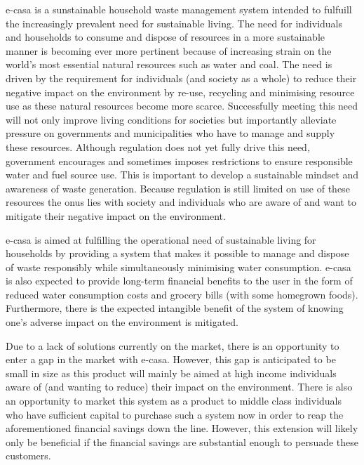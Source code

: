 \documentclass[a4paper,11pt,fleqn]{report}
\begin{document}
\ac{e-casa} is a sunstainable household waste management system intended to fulfuill the increasingly prevalent need for sustainable living. The need for individuals and households to consume and dispose of resources in a more sustainable manner is becoming ever more pertinent because of increasing strain on the world's most essential natural resources such as water and coal. The need is driven by the requirement for individuals (and society as a whole) to reduce their negative impact on the environment by re-use, recycling and minimising resource use as these natural resources become more scarce. Successfully meeting this need will not only improve living conditions for societies but importantly alleviate pressure on governments and municipalities who have to manage and supply these resources.
Although regulation does not yet fully drive this need, government encourages and sometimes imposes restrictions to ensure responsible water and fuel source use. This is important to develop a sustainable mindset and awareness of waste generation. Because regulation is still limited on use of these resources the onus lies with society and individuals who are aware of and want to mitigate their negative impact on the environment.

\ac{e-casa} is aimed at fulfilling the operational need of sustainable living for households by providing a system that makes it possible to manage and dispose of waste responsibly while simultaneously minimising water consumption. \ac{e-casa} is also expected to provide long-term financial benefits to the user in the form of reduced water consumption costs and grocery bills (with some homegrown foods). Furthermore, there is the expected intangible benefit of the system of knowing one's adverse impact on the environment is mitigated.

Due to a lack of solutions currently on the market, there is an opportunity to enter a gap in the market with \ac{e-casa}. However, this gap is anticipated to be small in size as this product will mainly be aimed at high income individuals aware of (and wanting to reduce) their impact on the environment. There is also an opportunity to market this system as a product to middle class individuals who have sufficient capital to purchase such a system now in order to reap the aforementioned financial savings down the line. However, this extension will likely only be beneficial if the financial savings are substantial enough to persuade these customers.\\
\end{document}
